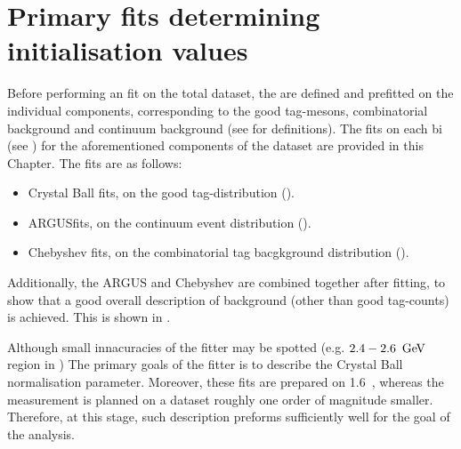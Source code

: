 \chapter{Primary \texorpdfstring{\Mbc}{Mbc} fits determining initialisation values}\label{sec:appendix_primary_fits}
Before performing an \Mbc fit on the total dataset, the  are defined and prefitted on the individual components, corresponding to the good tag-\B mesons, combinatorial \BB background and continuum background (see  for definitions).
The \Mbc fits on each \EB bi (see ) for the aforementioned components of the dataset are provided in this Chapter.
The fits are as follows:
\begin{itemize}
    \item Crystal Ball \PDF fits, on the good tag-\B \Mbc distribution ().
    \item ARGUS\PDF fits, on the continuum event \Mbc distribution ().
    \item Chebyshev \PDF fits, on the combinatorial \BB tag bacgkground distribution ().
\end{itemize}

Additionally, the ARGUS and Chebyshev  are combined together after fitting, to show that a good overall description of background (other than good tag-\B counts) is achieved.
This is shown in  .

Although small innacuracies of the fitter may be spotted (e.g. $2.4-2.6~\mathrm{\,Ge\kern -0.1em V}$ region in ) The primary goals of the fitter is to describe the Crystal Ball normalisation parameter.
Moreover, these fits are prepared on 1.6~\invab, whereas the measurement is planned on a dataset roughly one order of magnitude smaller.
Therefore, at this stage, such description preforms sufficiently well for the goal of the analysis.

